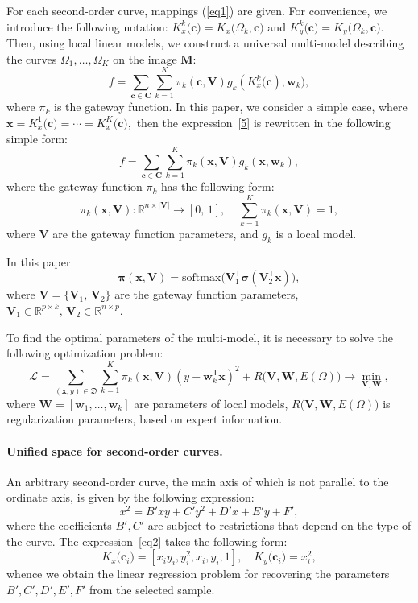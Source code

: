 For each second-order curve, mappings (\ref{eq1}) are given. For convenience, we introduce the following notation: $K_x^k\bigr(\mathbf{c}\bigr) = K_x\bigr(\Omega_k, \mathbf{c}\bigr)$ and $K_y^k\bigr(\mathbf{c}\bigr) = K_y\bigr(\Omega_k, \mathbf{c}\bigr)$. Then, using local linear models, we construct a universal multi-model describing the curves $\Omega_1, \dots, \Omega_K$ on the image $\mathbf{M}$:
\[
\label{5}
	f = \sum\limits_{\mathbf{c} \in \mathbf{C}} \sum_{k = 1}^{K} \pi_k(\mathbf{c}, \mathbf{V})g_k(K^k_{x}\bigl(\mathbf{c}), \mathbf{w}_k), 
\]
where $\pi_k$ is the  gateway function. In this paper, we consider a simple case, where $\mathbf{x}=K^1_{x}\bigl(\mathbf{c})=\cdots=K^K_{x}\bigl(\mathbf{c}),$ then the expression~\eqref{5} is rewritten in the following simple form:
\[
\label{5_1}
	f = \sum\limits_{\mathbf{c} \in \mathbf{C}} \sum_{k = 1}^{K} \pi_k(\mathbf{x}, \mathbf{V})g_k(\mathbf{x}, \mathbf{w}_k), 
\]
where the gateway function $\pi_k$ has the following form:
\[
\label{6}
	\pi_k(\mathbf{x}, \mathbf{V}): \mathbb{R}^{n\times |\mathbf{V}|} \rightarrow [0, \, 1], \; \; \; \; \sum\limits_{k = 1}^{K}\pi_k(\mathbf{x}, \mathbf{V}) = 1,
\]
where $\mathbf{V}$ are the gateway function parameters, and $g_k$ is a local model.
    
In this paper
\[
    \boldsymbol{\pi}(\mathbf{x}, \mathbf{V}) = \text{softmax}\bigl(\mathbf{V}_1^{\mathsf{T}}\boldsymbol{\sigma}(\mathbf{V}_2^{\mathsf{T}}\mathbf{x}) \bigr),
\]
where $\mathbf{V} = \{ \mathbf{V}_1, \, \mathbf{V}_2\}$ are the gateway function parameters,
$\mathbf{V}_1 \in \mathbb{R}^{p \times k}, \, \mathbf{V}_2 \in \mathbb{R}^{n \times p}$. 

To find the optimal parameters of the multi-model, it is necessary to solve the following optimization problem:
\[\label{9}
\mathcal{L} = \sum\limits_{(\mathbf{x}, y) \in \mathfrak{D}} \sum\limits_{k = 1}^{K} \pi_k(\mathbf{x}, \mathbf{V})(y - \mathbf{w}_k^{\mathsf{T}}\mathbf{x})^2 + R\bigl(\mathbf{V}, \mathbf{W}, E(\Omega)\bigr) \rightarrow \min_{\mathbf{V}, \mathbf{W}},
\]
where $\mathbf{W} = [\mathbf{w}_1, \dots, \mathbf{w}_k]$ are  parameters of local models, $R\bigl(\mathbf{V}, \mathbf{W}, E(\Omega)\bigr)$ is regularization parameters, based on expert information.

\paragraph{ Unified space for second-order curves.} An arbitrary second-order curve, the main axis of which is not parallel to the ordinate axis, is given by the following expression:
\[
\label{st:coef}
x^2 = B'xy+C'y^2+D'x+E'y+F',
\]
where the coefficients $B ', C'$ are subject to restrictions that depend on the type of the curve. The expression~\eqref{eq2} takes the following form:
\[
\label{st:K_map}
K_x\bigr(\mathbf{c}_i\bigr)=\left[x_iy_i, y_i^2, x_i, y_i, 1\right], \quad K_y\bigr(\mathbf{c}_i\bigr)=x_i^2,
\]
whence we obtain the linear regression problem for recovering the parameters $ B ', C', D ', E', F '$ from the selected sample.


